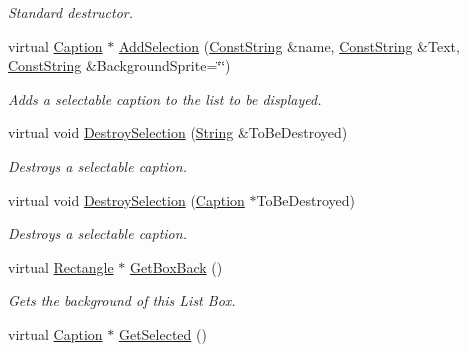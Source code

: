 \begin{DoxyCompactItemize}
\begin{DoxyCompactList}\small\item\em Standard destructor. \item\end{DoxyCompactList}\item 
virtual \hyperlink{classMezzanine_1_1UI_1_1Caption}{Caption} $\ast$ \hyperlink{classMezzanine_1_1UI_1_1ListBox_aa2133933ef147bb658ddb9e7102cbddd}{AddSelection} (\hyperlink{namespaceMezzanine_a63cd699ac54b73953f35ec9cfc05e506}{ConstString} \&name, \hyperlink{namespaceMezzanine_a63cd699ac54b73953f35ec9cfc05e506}{ConstString} \&Text, \hyperlink{namespaceMezzanine_a63cd699ac54b73953f35ec9cfc05e506}{ConstString} \&BackgroundSprite=\char`\"{}\char`\"{})
\begin{DoxyCompactList}\small\item\em Adds a selectable caption to the list to be displayed. \item\end{DoxyCompactList}\item 
virtual void \hyperlink{classMezzanine_1_1UI_1_1ListBox_a943079b1c090b216fbd29817af42efcf}{DestroySelection} (\hyperlink{namespaceMezzanine_acf9fcc130e6ebf08e3d8491aebcf1c86}{String} \&ToBeDestroyed)
\begin{DoxyCompactList}\small\item\em Destroys a selectable caption. \item\end{DoxyCompactList}\item 
virtual void \hyperlink{classMezzanine_1_1UI_1_1ListBox_a3926e83fb6bbde6205f156ea5c989edf}{DestroySelection} (\hyperlink{classMezzanine_1_1UI_1_1Caption}{Caption} $\ast$ToBeDestroyed)
\begin{DoxyCompactList}\small\item\em Destroys a selectable caption. \item\end{DoxyCompactList}\item 
virtual \hyperlink{classMezzanine_1_1UI_1_1Rectangle}{Rectangle} $\ast$ \hyperlink{classMezzanine_1_1UI_1_1ListBox_ac24fd38d4300b8788b3e42ba2a17c6f7}{GetBoxBack} ()
\begin{DoxyCompactList}\small\item\em Gets the background of this List Box. \item\end{DoxyCompactList}\item 
virtual \hyperlink{classMezzanine_1_1UI_1_1Caption}{Caption} $\ast$ \hyperlink{classMezzanine_1_1UI_1_1ListBox_ae2b97c85a09fd6d74f659c1dc9cd125c}{GetSelected} ()

\end{DoxyCompactItemize}
